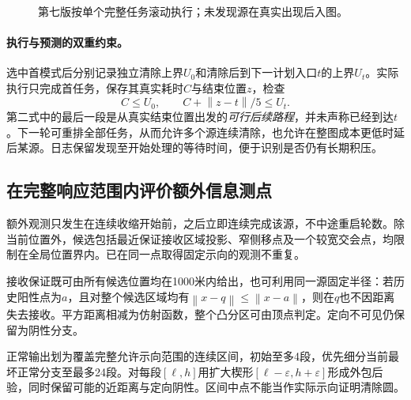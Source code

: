 \documentclass[UTF8,a4paper,zihao=-4,fontset=windows]{ctexart}
\newcommand{\norm}[1]{\left\lVert#1\right\rVert}
\begin{document}
\begin{figure}[htbp]\centering
{}
\caption{第七版按单个完整任务滚动执行；未发现源在真实出现后入图。}
\end{figure}

\paragraph{执行与预测的双重约束。}
选中首模式后分别记录独立清除上界$U_0$和清除后到下一计划入口$t$的上界$U_t$。实际执行只完成首任务，保存其真实耗时$C$与结束位置$z$，检查
\[
C\le U_0,\qquad C+\norm{z-t}/5\le U_t.
\]
第二式中的最后一段是从真实结束位置出发的\emph{可行后续路程}，并未声称已经到达$t$。下一轮可重排全部任务，从而允许多个源连续清除，也允许在整图成本更低时延后某源。日志保留发现至开始处理的等待时间，便于识别是否仍有长期积压。

\subsection{在完整响应范围内评价额外信息测点}
额外观测只发生在连续收缩开始前，之后立即连续完成该源，不中途重启轮数。除当前位置外，候选包括最近保证接收区域投影、窄侧移点及一个较宽交会点，均限制在全局位置界内。已在同一点取得固定示向的观测不重复。

接收保证既可由所有候选位置均在1000米内给出，也可利用同一源固定半径：若历史阳性点为$a$，且对整个候选区域均有$\norm{x-q}\le\norm{x-a}$，则在$q$也不因距离失去接收。平方距离相减为仿射函数，整个凸分区可由顶点判定。定向不可见仍保留为阴性分支。

正常输出划为覆盖完整允许示向范围的连续区间，初始至多4段，优先细分当前最坏正常分支至最多24段。对每段$[\ell,h]$用扩大楔形$[\ell-\varepsilon,h+\varepsilon]$形成外包后验，同时保留可能的近距离与定向阴性。区间中点不能当作实际示向证明清除圆。
\end{document}
